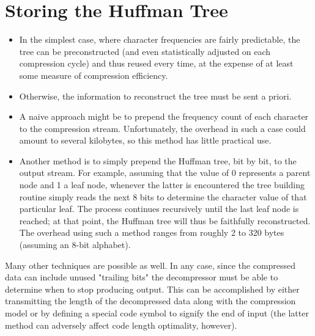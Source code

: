 \documentclass[12pt]{report}
\begin{document}
\section{Storing the Huffman Tree}

\begin{itemize}
\item In the simplest case, where character frequencies are fairly predictable, the tree can be preconstructed (and even statistically adjusted on each compression cycle) and thus reused every time, at the expense of at least some measure of compression efficiency.

\item Otherwise, the information to reconstruct the tree must be sent a priori.

\item A naive approach might be to prepend the frequency count of each character to the compression stream. Unfortunately, the overhead in such a case could amount to several kilobytes, so this method has little practical use.

\item Another method is to simply prepend the Huffman tree, bit by bit, to the output stream. For example, assuming that the value of 0 represents a parent node and 1 a leaf node, whenever the latter is encountered the tree building routine simply reads the next 8 bits to determine the character value of that particular leaf. The process continues recursively until the last leaf node is reached; at that point, the Huffman tree will thus be faithfully reconstructed. The overhead using such a method ranges from roughly 2 to 320 bytes (assuming an 8-bit alphabet). 

\begin{figure}[h!]
	\centering
\end{figure}

\end{itemize}

Many other techniques are possible as well. In any case, since the compressed data can include unused "trailing bits" the decompressor must be able to determine when to stop producing output. This can be accomplished by either transmitting the length of the decompressed data along with the compression model or by defining a special code symbol to signify the end of input (the latter method can adversely affect code length optimality, however).
\end{document}
